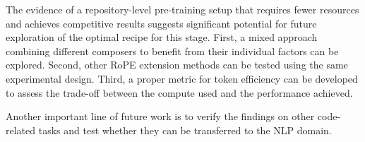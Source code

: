 The evidence of a repository-level pre-training setup that requires fewer resources and achieves competitive results suggests significant potential for future exploration of the optimal recipe for this stage. First, a mixed approach combining different composers to benefit from their individual factors can be explored. Second, other RoPE extension methods can be tested using the same experimental design. Third, a proper metric for token efficiency can be developed to assess the trade-off between the compute used and the performance achieved.

Another important line of future work is to verify the findings on other code-related tasks and test whether they can be transferred to the NLP domain.

